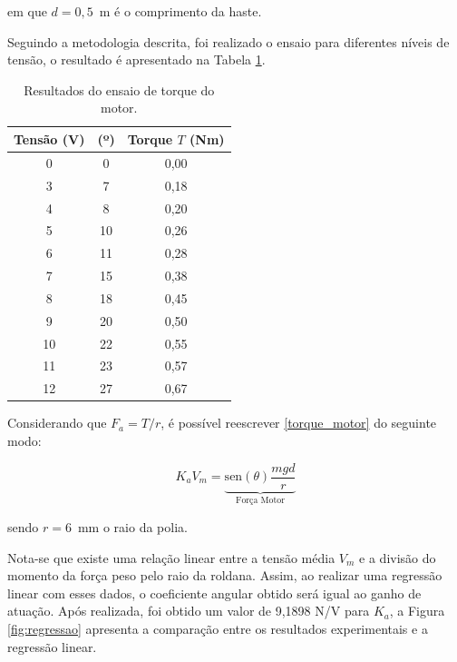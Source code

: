\noindent em que $d = 0,5$~m é o comprimento da haste.

Seguindo a metodologia descrita, foi realizado o ensaio para diferentes níveis de tensão, o resultado é apresentado na Tabela \ref{tab:ensaio_motor}.

\begin{table}[H]
    \centering
    \caption[Resultados do ensaio de torque do motor]{Resultados do ensaio de torque do motor.}
    \begin{tabular}{c|c|c}
    \textbf{Tensão (V)}  & \bm{$\theta$} \textbf{(º)} & \textbf{Torque $T$ (Nm)}\\ \hline
    0 & 0 & 0,00 \\ 
    3 & 7 & 0,18 \\ 
    4 & 8 & 0,20 \\ 
    5 & 10 & 0,26 \\ 
    6 & 11 & 0,28 \\ 
    7 & 15 & 0,38 \\ 
    8 & 18 & 0,45 \\ 
    9 & 20 & 0,50 \\ 
    10 & 22 & 0,55 \\ 
    11 & 23 & 0,57 \\ 
    12 & 27 & 0,67 \\ 
    \end{tabular}
    \label{tab:ensaio_motor}
\end{table}

Considerando que $F_a = T/r$, é possível reescrever \eqref{torque_motor} do seguinte modo:

\begin{equation}
    K_aV_m = \underbrace{\text{sen}(\theta)\frac{mgd}{r}}_{\text{Força Motor}}
    \label{forca_motor}
\end{equation}

\noindent sendo $r=6$~mm o raio da polia.

Nota-se que existe uma relação linear entre a tensão média $V_m$ e a divisão do momento da força peso pelo raio da roldana. Assim, ao realizar uma regressão linear com esses dados, o coeficiente angular obtido será igual ao ganho de atuação. Após realizada, foi obtido um valor de 9,1898 N/V
para $K_a$, a Figura \ref{fig:regressao} apresenta a comparação entre os resultados experimentais e a regressão linear.

